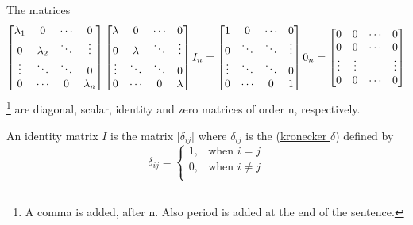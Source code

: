 \documentclass{article}
\begin{document}
\hNewLine					%
The matrices
\[
	\begin{bmatrix}
	    \lambda_{1} & 0 		   & \cdots   & 0 \\
	    0 			& \lambda_{2}  & \ddots   & \vdots \\
	    \vdots 		& \ddots 	   & \ddots   & 0 \\
	    0 			& \cdots       & 0 		  & \lambda_{n}
	\end{bmatrix}
	\begin{bmatrix}
	    \lambda & 0 		& \cdots  & 0 \\
	    0 		& \lambda  	& \ddots  & \vdots \\
	    \vdots  & \ddots 	& \ddots  & 0 \\
	    0 		& \cdots 	& 0 	  & \lambda
	\end{bmatrix}
	I_{n}
	=
	\begin{bmatrix}
	    1 		& 0 	 & \cdots  & 0 \\
	    0 		& \ddots & \ddots  & \vdots \\
	    \vdots 	& \ddots & \ddots  & 0 \\
	    0 		& \cdots & 0 	   & 1
	\end{bmatrix}
	0_{n}
	=
	\begin{bmatrix}
	    0	   	& 0 	 & \cdots  & 0 \\
	    0 		& 0 	 & \cdots  & 0 \\
	    \vdots  & \vdots & \space  & \vdots \\
	    0 		& 0  	 & \cdots  & 0
	\end{bmatrix}
\]
\footnote{A comma is added, after n. Also period is added at the end of the sentence.}
are diagonal, scalar, identity and zero matrices of order n, respectively.

An identity matrix $I$ is the matrix [$\delta_{ij}$] where $\delta_{ij}$ is the (\underline{kronecker $\delta$}) defined by
\[
	\delta_{ij}=
	\begin{cases}
	    1,  & \text{when } i = j\\
	    0,  & \text{when } i\neq j\\
	\end{cases}
\]
\end{document}
